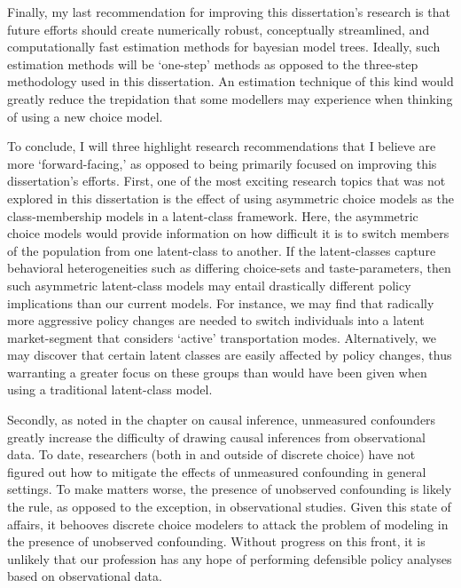 \documentclass{article}
\begin{document}
Finally, my last recommendation for improving this dissertation's research is that future efforts should create numerically robust, conceptually streamlined, and computationally fast estimation methods for bayesian model trees. Ideally, such estimation methods will be `one-step' methods as opposed to the three-step methodology used in this dissertation. An estimation technique of this kind would greatly reduce the trepidation that some modellers may experience when thinking of using a new choice model.

To conclude, I will three highlight research recommendations that I believe are more `forward-facing,' as opposed to being primarily focused on improving this dissertation's efforts. First, one of the most exciting research topics that was not explored in this dissertation is the effect of using asymmetric choice models as the class-membership models in a latent-class framework. Here, the asymmetric choice models would provide information on how difficult it is to switch members of the population from one latent-class to another. If the latent-classes capture behavioral heterogeneities such as differing choice-sets and taste-parameters, then such asymmetric latent-class models may entail drastically different policy implications than our current models. For instance, we may find that radically more aggressive policy changes are needed to switch individuals into a latent market-segment that considers `active' transportation modes. Alternatively, we may discover that certain latent classes are easily affected by policy changes, thus warranting a greater focus on these groups than would have been given when using a traditional latent-class model.

Secondly, as noted in the chapter on causal inference, unmeasured confounders greatly increase the difficulty of drawing causal inferences from observational data. To date, researchers (both in and outside of discrete choice) have not figured out how to mitigate the effects of unmeasured confounding in general settings. To make matters worse, the presence of unobserved confounding is likely the rule, as opposed to the exception, in observational studies. Given this state of affairs, it behooves discrete choice modelers to attack the problem of modeling in the presence of unobserved confounding. Without progress on this front, it is unlikely that our profession has any hope of performing defensible policy analyses based on observational data.
\end{document}
